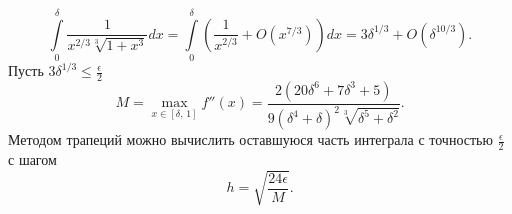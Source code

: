\documentclass[a4paper]{article}
\title{}
\begin{document}
	\maketitle
\[
	\int\limits_{0}^{\delta} \frac{1}{x^{2 /3}\sqrt[3]{1+x^3}}dx=
	\int\limits_{0}^{\delta} \left( \frac{1}{x^{2 /3}}+ O\left( 
	x^{7 /3}\right)  \right)  dx=
	3 \delta^{ 1 /3}+O\left( \delta^{10 /3} \right) 
.\] 
Пусть 
$3 \delta^{1 /3 }\le \frac{\epsilon}{2}$ 
\[
	M=\max_{x \in [\delta,\,1]} f''(x)=\frac{2 \left(20 \delta ^6+7 \delta ^3+5\right)}{9 \left(\delta ^4+\delta
   \right)^2 \sqrt[3]{\delta ^5+\delta ^2}}
.\] 
Методом трапеций можно вычислить оставшуюся часть интеграла
с точностью $\frac{\epsilon}{2}$ с шагом
\[
h = \sqrt{ \frac{24\epsilon}{M}} 
.\] 
\end{document}

